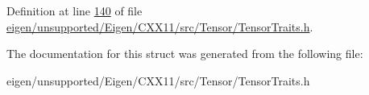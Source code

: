 Definition at line \hyperlink{eigen_2unsupported_2_eigen_2_c_x_x11_2src_2_tensor_2_tensor_traits_8h_source_l00140}{140} of file \hyperlink{eigen_2unsupported_2_eigen_2_c_x_x11_2src_2_tensor_2_tensor_traits_8h_source}{eigen/unsupported/\+Eigen/\+C\+X\+X11/src/\+Tensor/\+Tensor\+Traits.\+h}.



The documentation for this struct was generated from the following file\+:\begin{DoxyCompactItemize}
\item 
eigen/unsupported/\+Eigen/\+C\+X\+X11/src/\+Tensor/\+Tensor\+Traits.\+h\end{DoxyCompactItemize}
